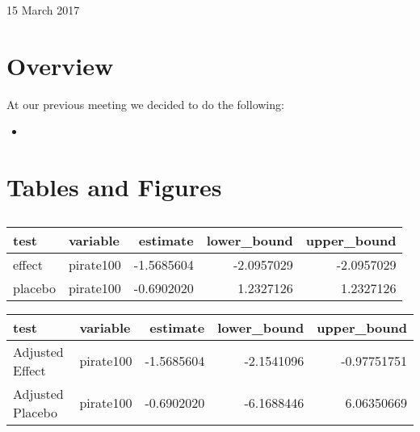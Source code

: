 \documentclass[12pt]{article}
\begin{document}
	
\begin{center}
	\Large 15 March 2017
\end{center}

\section{Overview}

At our previous meeting we decided to do the following:

\begin{itemize}
	\item
\end{itemize}

\section{Tables and Figures}

\subsection{}

\begin{table}[ht]
	\centering
	\begin{tabular}{llrrr}
		\hline
		test & variable & estimate & lower\_bound & upper\_bound \\ 
		\hline
		effect & pirate100 & -1.5685604 & -2.0957029 & -2.0957029 \\ 
		placebo & pirate100 & -0.6902020 & 1.2327126 & 1.2327126 \\ 
		\hline
	\end{tabular}
\end{table}

\begin{table}[ht]
	\centering
	\begin{tabular}{llrrr}
		\hline
		test & variable & estimate & lower\_bound & upper\_bound \\ 
		\hline
		Adjusted Effect & pirate100 & -1.5685604 & -2.1541096 & -0.97751751 \\ 
		Adjusted Placebo & pirate100 & -0.6902020 & -6.1688446 & 6.06350669 \\ 
		\hline
	\end{tabular}
\end{table}
\end{document}
